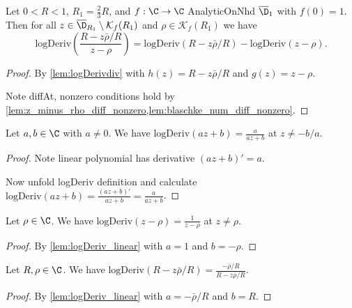 \begin{lemma}\label{lem:logDeriv_Blaschke_is_diff} 
\leanok
Let $0<R<1$, $R_1=\frac{2}{3}R$, and $f:\C\to\C$ AnalyticOnNhd $\overline{\D}_1$ with $f(0)=1$. Then for all $z\in \overline{\D}_{R_1}\setminus\mathcal K_f(R_1)$ and $\rho \in \mathcal{K}_f(R_1)$ we have
\[\text{logDeriv}\left(\frac{R-z\bar\rho/R}{z-\rho}\right) = \text{logDeriv}(R-z\bar\rho/R) - \text{logDeriv}(z-\rho). \]
\end{lemma}
\begin{proof}
\leanok
{}
By \cref{lem:logDerivdiv} with $h(z)=R-z\bar\rho/R$ and $g(z)=z-\rho$.

Note diffAt, nonzero conditions hold by \cref{lem:z_minus_rho_diff_nonzero,lem:blaschke_num_diff_nonzero}.
\end{proof}

\begin{lemma}\label{lem:logDeriv_linear} 
\leanok
Let $a,b \in \C$ with $a\neq0$. We have $\text{logDeriv}(az+b) = \frac{a}{az+b}$ at $z\neq -b/a$.
\end{lemma}
\begin{proof}
\leanok
Note linear polynomial has derivative $(az+b)'=a$.

Now unfold logDeriv definition and calculate $\text{logDeriv}(az+b) = \frac{(az+b)'}{az+b} =\frac{a}{az+b}$.
\end{proof}

\begin{lemma}\label{lem:logDeriv_denominator} 
\leanok
Let $\rho \in \C$. We have $\text{logDeriv}(z-\rho) = \frac{1}{z-\rho}$ at $z\neq\rho$.
\end{lemma}
\begin{proof}
\leanok
{}
By \cref{lem:logDeriv_linear} with $a=1$ and $b=-\rho$.
\end{proof}

\begin{lemma}\label{lem:logDeriv_numerator_pre} 
\leanok
Let $R, \rho \in \C$. We have $\text{logDeriv}(R-z\bar\rho/R) = \frac{-\bar\rho/R}{R-z\bar\rho/R}$.
\end{lemma}
\begin{proof}
\leanok
{}
By \cref{lem:logDeriv_linear} with $a=-\bar\rho/R$ and $b=R$.
\end{proof}

